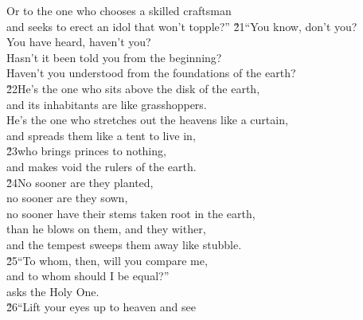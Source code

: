 \begin{poetry}
\poeml Or to the one who chooses a skilled craftsman \\
\poemll    and seeks to erect an idol that won't topple?''
\poeml \v{21}``You know, don't you? \\
\poemll    You have heard, haven't you? \\
\poeml Hasn't it been told you from the beginning? \\
\poemll    Haven't you understood from the foundations of the earth? \\
\poeml \v{22}He's the one who sits above the disk of the earth, \\
\poemll    and its inhabitants are like grasshoppers. \\
\poeml He's the one who stretches out the heavens like a curtain, \\
\poemll    and spreads them like a tent to live in, \\
\poeml \v{23}who brings princes to nothing, \\
\poemll    and makes void the rulers of the earth. \\
\poeml \v{24}No sooner are they planted, \\
\poemll    no sooner are they sown, \\
\poemlll       no sooner have their stems taken root in the earth, \\
\poeml than he blows on them, and they wither, \\
\poemll    and the tempest sweeps them away like stubble. \\
\poeml \v{25}``To whom, then, will you compare me, \\
\poemll    and to whom should I be equal?'' \\
\poemlll       asks the Holy One. \\
\poeml \v{26}``Lift your eyes up to heaven and see \\

\end{poetry}
